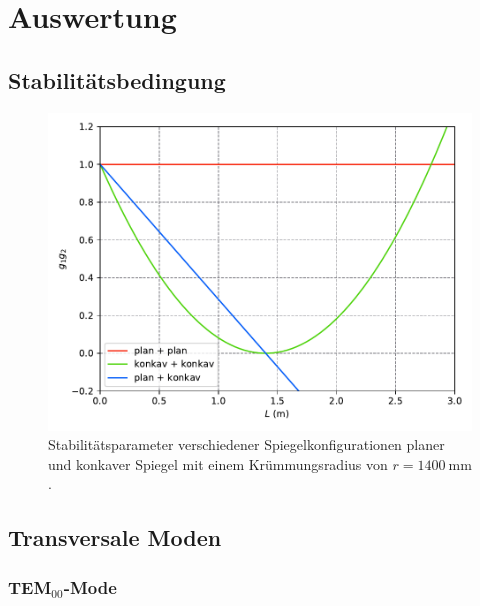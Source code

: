 \section{Auswertung}
\label{sec:Auswertung}

\subsection{Stabilitätsbedingung}

\begin{figure}[H]
    \centering
    \includegraphics[scale=0.7]{content/g1g2.pdf}
    \vspace{-10pt}
    \caption{Stabilitätsparameter verschiedener Spiegelkonfigurationen planer und konkaver Spiegel mit einem Krümmungsradius
    von $r = \SI{1400}{\milli\meter}$.}
    \label{fig:TEM00}
\end{figure}

\subsection{Transversale Moden}
\subsubsection{TEM$_{00}$-Mode}


